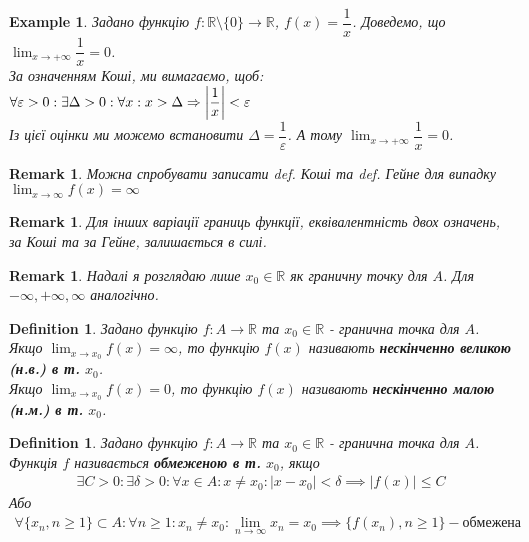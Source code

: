 \documentclass[a4paper, 14pt]{article}
\theoremstyle{theoremdd}
\theoremstyle{theoremdd}
\newtheorem{definition}[theorem]{Definition}
\theoremstyle{theoremdd}
\theoremstyle{theoremdd}
\newtheorem{example}[theorem]{Example}
\theoremstyle{theoremdd}
\theoremstyle{theoremdd}
\newtheorem{remark}[theorem]{Remark}
\theoremstyle{theoremdd}
\theoremstyle{theoremdd}
\begin{document}
	\begin{example}
	Задано функцію $f: \mathbb{R} \setminus \{0\} \to \mathbb{R}$, $f(x) = \dfrac{1}{x}$. Доведемо, що $\displaystyle\lim_{x \to +\infty} \dfrac{1}{x} = 0$.\\
	За означенням Коші, ми вимагаємо, щоб:\\
	$\forall \varepsilon > 0: \exists \Delta > 0: \forall x: x > \Delta \Rightarrow \abs{\dfrac{1}{x}} < \varepsilon$\\
	Із цієї оцінки ми можемо встановити $\Delta = \dfrac{1}{\varepsilon}$. А тому $\displaystyle\lim_{x \to +\infty} \dfrac{1}{x} = 0$.
	\end{example}
	
	\begin{remark}
	Можна спробувати записати def. Коші та def. Гейне для випадку $\displaystyle \lim_{x \to \infty} f(x) = \infty$
	\end{remark}
	
	\begin{remark}
	Для інших варіації границь функції, еквівалентність двох означень, за Коші та за Гейне, залишається в силі.
	\end{remark}
	
	\begin{remark}
	Надалі я розглядаю лише $x_0 \in \mathbb{R}$ як граничну точку для $A$. Для $-\infty,+\infty,\infty$ аналогічно.
	\end{remark}
	
	\begin{definition}
	Задано функцію $f: A \to \mathbb{R}$ та $x_0 \in \mathbb{R}$ - гранична точка для $A$.\\
	Якщо $\displaystyle \lim_{x \to x_0} f(x) = \infty$, то функцію $f(x)$ називають \textbf{нескінченно великою (н.в.) в т.} $x_0$.\\
	Якщо $\displaystyle \lim_{x \to x_0} f(x) = 0$, то функцію $f(x)$ називають \textbf{нескінченно малою (н.м.) в т.} $x_0$.\\
	\end{definition}
	
	\begin{definition}
	Задано функцію $f: A \to \mathbb{R}$ та $x_0 \in \mathbb{R}$ - гранична точка для $A$.\\
	Функція $f$ називається \textbf{обмеженою в т.} $x_0$, якщо
	\begin{align*}
	\exists C > 0: \exists \delta > 0: \forall x \in A: x \neq x_0: |x-x_0|<\delta \implies |f(x)| \leq C
	\end{align*}
	Або
	\begin{align*}
	\forall \{x_n, n \geq 1\} \subset A: \forall n \geq 1: x_n \neq x_0: \lim_{n \to \infty} x_n = x_0 \implies \{f(x_n), n \geq 1\} - \text{обмежена}
	\end{align*}
	\end{definition}
	
\end{document}
